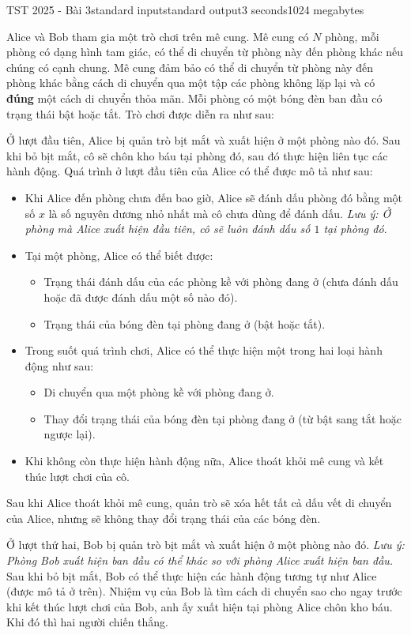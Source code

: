 \begin{problem}{TST 2025 - Bài 3}{standard input}{standard output}{3 seconds}{1024 megabytes}

Alice và Bob tham gia một trò chơi trên mê cung. Mê cung có $N$ phòng, mỗi phòng có dạng hình tam giác, có thể di chuyển từ phòng này đến phòng khác nếu chúng có cạnh chung. Mê cung đảm bảo có thể di chuyển từ phòng này đến phòng khác bằng cách di chuyển qua một tập các phòng không lặp lại và có \textbf{đúng} một cách di chuyển thỏa mãn. Mỗi phòng có một bóng đèn ban đầu có trạng thái bật hoặc tắt. Trò chơi được diễn ra như sau:

Ở lượt đầu tiên, Alice bị quản trò bịt mắt và xuất hiện ở một phòng nào đó. Sau khi bỏ bịt mắt, cô sẽ chôn kho báu tại phòng đó, sau đó thực hiện liên tục các hành động. Quá trình ở lượt đầu tiên của Alice có thể được mô tả như sau:
\begin{itemize}
   \item Khi Alice đến phòng chưa đến bao giờ, Alice sẽ đánh dấu phòng đó bằng một số $x$ là số nguyên dương nhỏ nhất mà cô chưa dùng để đánh dấu. \textit{Lưu ý: Ở phòng mà Alice xuất hiện đầu tiên, cô sẽ luôn đánh dấu số $1$ tại phòng đó}.
   \item Tại một phòng, Alice có thể biết được:
   \begin{itemize}
      \item Trạng thái đánh dấu của các phòng kề với phòng đang ở (chưa đánh dấu hoặc đã được đánh dấu một số nào đó).
      \item Trạng thái của bóng đèn tại phòng đang ở (bật hoặc tắt).
   \end{itemize}
   \item Trong suốt quá trình chơi, Alice có thể thực hiện một trong hai loại hành động như sau:
   \begin{itemize}
      \item Di chuyển qua một phòng kề với phòng đang ở.
      \item Thay đổi trạng thái của bóng đèn tại phòng đang ở (từ bật sang tắt hoặc ngược lại).
   \end{itemize}
   \item Khi không còn thực hiện hành động nữa, Alice thoát khỏi mê cung và kết thúc lượt chơi của cô.
\end{itemize}

Sau khi Alice thoát khỏi mê cung, quản trò sẽ xóa hết tất cả dấu vết di chuyển của Alice, nhưng sẽ không thay đổi trạng thái của các bóng đèn.

Ở lượt thứ hai, Bob bị quản trò bịt mắt và xuất hiện ở một phòng nào đó. \textit{Lưu ý: Phòng Bob xuất hiện ban đầu có thể khác so với phòng Alice xuất hiện ban đầu.} Sau khi bỏ bịt mắt, Bob có thể thực hiện các hành động tương tự như Alice (được mô tả ở trên). Nhiệm vụ của Bob là tìm cách di chuyển sao cho ngay trước khi kết thúc lượt chơi của Bob, anh ấy xuất hiện tại phòng Alice chôn kho báu. Khi đó thì hai người chiến thắng.


\end{problem}
